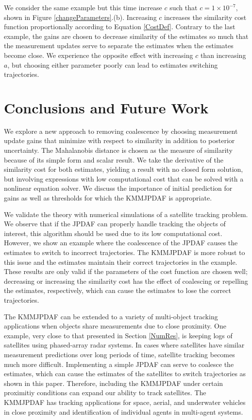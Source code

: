 \documentclass[letterpaper, 10pt, conference]{ieeeconf}
\begin{document}
We consider the same example but this time increase $c$ such that $c=1\times10^{-7}$, shown in Figure \ref{changeParameters}.(b). Increasing $c$ increases the similarity cost function proportionally according to Equation \ref{CostDef}. Contrary to the last example, the gains are chosen to decrease similarity of the estimates so much that the measurement updates serve to separate the estimates when the estimates become close. We experience the opposite effect with increasing $c$ than increasing $a$, but choosing either parameter poorly can lead to estimates switching trajectories.


\section{Conclusions and Future Work}
\label{ConclusionFutureWork}
We explore a new approach to removing coalescence by choosing measurement update gains that minimize with respect to similarity in addition to posterior uncertainty. The Mahalanobis distance is chosen as the measure of similarity because of its simple form and scalar result. We take the derivative of the similarity cost for both estimates, yielding a result with no closed form solution, but involving expressions with low computational cost that can be solved with a nonlinear equation solver. We discuss the importance of initial prediction for gains as well as thresholds for which the KMMJPDAF is appropriate.

We validate the theory with numerical simulations of a satellite tracking problem. We observe that if the JPDAF can properly handle tracking the objects of interest, this algorithm should be used due to its low computational cost. However, we show an example where the coalescence of the JPDAF causes the estimates to switch to incorrect trajectories. The KMMJPDAF is more robust to this issue and the estimates maintain their correct trajectories in the example. These results are only valid if the parameters of the cost function are chosen well; decreasing or increasing the similarity cost has the effect of coalescing or repelling the estimates, respectively, which can cause the estimates to lose the correct trajectories.

The KMMJPDAF can be extended to a variety of multi-object tracking applications when objects share measurements due to close proximity. One example, very close to that presented in Section \ref{NumRes}, is keeping logs of satellites using phased-array radar systems. In cases where satellites have similar measurement predictions over long periods of time, satellite tracking becomes much more difficult. Implementing a simple JPDAF can serve to coalesce the estimates, which can cause the estimates of the satellites to switch trajectories as shown in this paper. Therefore, including the KMMJPDAF under certain proximitiy conditions can expand our ability to track satellites. The KMMJPDAF has tracking applications for space, aerial, and underwater vehicles in close proximity and identification of individual agents in multi-agent systems.
\end{document}
